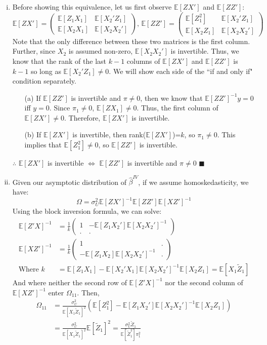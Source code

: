 \documentclass{article}
\renewcommand{\tilde}[1]{\widetilde{#1}}
\newcommand{\bhat}{\hat{\beta}}
\newcommand{\biv}{\bhat^{IV}}
\newcommand{\E}[1]{\mathbb{E}\left[#1\right]}%
\begin{document}
\begin{enumerate}[(i)]
	\item Before showing this equivalence, let us first observe $\E{ZX'}$ and $\E{ZZ'}$:
	\[
		\E{ZX'} = \begin{pmatrix} \E{Z_1X_1} & \E{X_2'Z_1} \\ \E{X_2X_1} & \E{X_2X_2'} \end{pmatrix}\text{, }
		\E{ZZ'} = \begin{pmatrix} \E{Z_1^2}  & \E{X_2'Z_1} \\ \E{X_2Z_1} & \E{X_2X_2'}  \end{pmatrix}
	\]
	Note that the only difference between these two matrices is the first column. Further, since $X_2$ is assumed non-zero, $\E{X_2X_2'}$ is invertible. Thus, we know that the rank of the last ${k-1}$ columns of $\E{ZX'}$ and $\E{ZZ'}$ is $k-1$ so long as ${\E{X_2'Z_1}\neq0}$. We will show each side of the ``if and only if" condition separately.
		\begin{itemize}
			\item[(a)] If $\E{ZZ'}$ is invertible and ${\pi\neq 0}$, then we know that ${\E{ZZ'}^{-1}y=0}$ iff $y=0$. Since ${\pi_1\neq 0}$, ${\E{ZX_1}\neq0}$. Thus, the first column of ${\E{ZX'}\neq 0}$. Therefore, $\E{ZX'}$ is invertible.
			
			\item[(b)] If $\E{ZX'}$ is invertible, then rank($\E{ZX'}$)=$k$, so ${\pi_1\neq0}$. This implies that $\E{Z_1^2}\neq 0$, so $\E{ZZ'}$ is invertible.
		\end{itemize}
	$\therefore$  $\E{ZX'}$ is invertible $\iff$ $\E{ZZ'}$ is invertible and ${\pi\neq 0}$ $\blacksquare$
	
	\item Given our asymptotic distribution of $\biv$, if we assume homoskedasticity, we have:
		\[
			\Omega = \sigma_U^2\E{ZX'}^{-1}\E{ZZ'}\E{XZ'}^{-1}
		\]
		Using the block inversion formula, we can solve:
		\begin{align*}
			\E{Z'X}^{-1} &= \frac{1}{k}\begin{pmatrix} 1 & -\E{Z_1X_2'}\E{X_2X_2'}^{-1} \\ . & . \end{pmatrix}	\\
			\E{XZ'}^{-1} &= \frac{1}{k}\begin{pmatrix} 1 & . \\ -\E{Z_1X_2}\E{X_2X_2'}^{-1} & . \end{pmatrix} 	\\
			\text{Where } k &= \E{Z_1X_1} - \E{X_2'X_1}\E{X_2X_2'}^{-1}\E{X_2Z_1} = \E{X_1\tilde{Z}_1}
		\end{align*}
		And where neither the second row of $\E{Z'X}^{-1}$ nor the second column of $\E{XZ'}^{-1}$ enter $\Omega_{11}$. Then,
		\begin{align*}
			\Omega_{11} &= \frac{\sigma_U^2}{\E{X_1\tilde{Z}_1}^2}\left(\E{Z_1^2 }- \E{Z_1X_2'}\E{X_2X_2'}^{-1}\E{X_2Z_1}\right)	\\
						&= \frac{\sigma_U^2}{\E{X_1\tilde{Z}_1}^2}\E{\tilde{Z}_1}^2 = \frac{\sigma_U^2\tilde{Z}_1}{\E{\tilde{Z}_1^2}\pi_1^2}
		\end{align*}
	

\end{enumerate}
\end{document}
